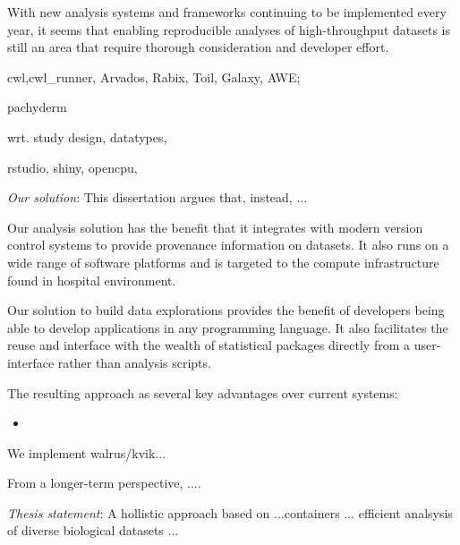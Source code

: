 With new analysis systems and frameworks continuing to be implemented every
year, it seems that enabling reproducible analyses of high-throughput datasets
is still an area that require thorough consideration and developer effort.

\begin{enumerate*}[label=(\roman*)]
    \item cwl,cwl\_runner, Arvados, Rabix, Toil, Galaxy,
        AWE;   
    \item pachyderm
    \item wrt. study design, datatypes, 
    \item rstudio, shiny, opencpu,
\end{enumerate*} 


\emph{Our solution}: 
This dissertation argues that, instead, ... 

Our analysis solution has the benefit that it integrates with modern version
control systems to provide provenance information on datasets. It also runs on a
wide range of software platforms and is targeted to the compute infrastructure
found in hospital environment. 

Our solution to build data explorations provides the benefit of developers being
able to develop applications in any programming language. It also facilitates
the reuse and interface with the wealth of statistical packages directly from a
user-interface rather than analysis scripts. 

The resulting approach as several key advantages over current systems: 
\begin{itemize} 
    \item
\end{itemize} 

We implement walrus/kvik... 

From a longer-term perspective, ....

\emph{Thesis statement}:
A hollistic approach based on ...containers ... efficient analsysis of diverse
biological datasets ... 

